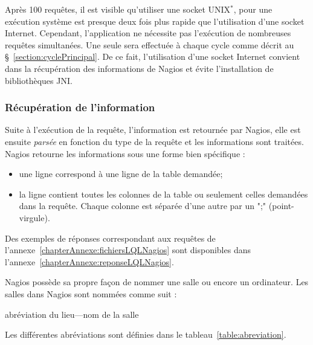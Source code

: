 Apr\`es 100 requ\^etes, il est visible qu'utiliser une socket UNIX$^*$, pour une ex\'ecution syst\`eme est presque deux fois plus rapide que l'utilisation d'une socket Internet.
Cependant, l'application ne n\'ecessite pas l'ex\'ecution de nombreuses requ\^etes simultan\'ees.
Une seule sera effectu\'ee \`a chaque cycle comme d\'ecrit au \S~\ref{section:cyclePrincipal}.
De ce fait, l'utilisation d'une socket Internet convient dans la r\'ecup\'eration des informations de Nagios et \'evite l'installation de biblioth\`eques JNI.

\subsubsection{R\'ecup\'eration de l'information}

Suite \`a l'ex\'ecution de la requ\^ete, l'information est retourn\'ee par Nagios, elle est ensuite \textit{pars\'ee} en fonction du type de la requ\^ete et les informations sont trait\'ees.
Nagios retourne les informations sous une forme bien sp\'ecifique : 

\begin{itemize}
	\item une ligne correspond \`a une ligne de la table demand\'ee;
	\item la ligne contient toutes les colonnes de la table ou seulement celles demand\'ees dans la requ\^ete.
	Chaque colonne est s\'epar\'ee d'une autre par un \textsf{";" (point-virgule)}.

\end{itemize}

\vspace{0.20cm}

Des exemples de r\'eponses correspondant aux requ\^etes de l'annexe~\ref{chapterAnnexe:fichiersLQLNagios} sont disponibles dans l'annexe~\ref{chapterAnnexe:reponseLQLNagios}.

Nagios poss\`ede sa propre fa\c{c}on de nommer une salle ou encore un ordinateur.
\noindent Les salles dans Nagios sont nomm\'ees comme suit : 

\begin{center}
	\textsf{abr\'eviation du lieu---nom de la salle}

\end{center}

\noindent Les diff\'erentes abr\'eviations sont d\'efinies dans le tableau~\ref{table:abreviation}.

\clearpage

